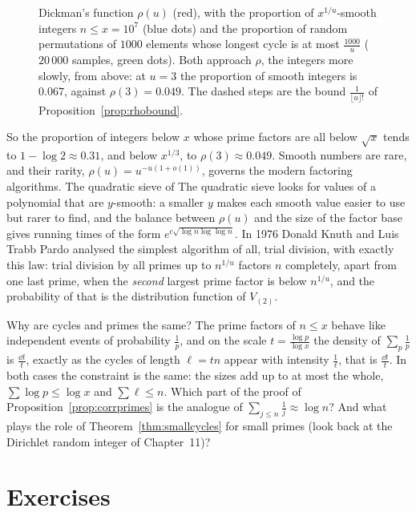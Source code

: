 \begin{figure}[ht]
\centering{}
\caption{Dickman's function $\rho(u)$ (red), with the proportion of $x^{1/u}$-smooth integers $n\le x=10^7$ (blue dots) and the proportion of random permutations of $1000$ elements whose longest cycle is at most $\frac{1000}u$ ($20\,000$ samples, green dots). Both
approach $\rho$, the integers more slowly, from above: at $u=3$ the proportion of smooth integers is $0.067$, against $\rho(3)=0.049$. The dashed steps are the bound $\frac1{\lfloor u\rfloor!}$ of Proposition~\ref{prop:rhobound}.}
\label{fig:rho}
\end{figure}

So the proportion of integers below $x$ whose prime factors are all below $\sqrt x$ tends to $1-\log2\approx0.31$, and below $x^{1/3}$, to $\rho(3)\approx0.049$. Smooth numbers are rare, and their rarity, $\rho(u)=u^{-u(1+o(1))}$, governs the modern factoring algorithms. The quadratic sieve of
The quadratic sieve looks for values of a polynomial that are $y$-smooth: a smaller $y$ makes each smooth value easier to use but rarer to find, and the balance between $\rho(u)$ and the size of the factor base gives running times of the form $e^{c\sqrt{\log n\log\log n}}$. In 1976 Donald Knuth and Luis Trabb Pardo
analysed the simplest algorithm of all, trial division, with exactly this law: trial division by all primes up to $n^{1/u}$ factors $n$ completely, apart from one last prime, when the \emph{second} largest prime factor is below $n^{1/u}$, and the probability of that is the
distribution function of $V_{(2)}$.

\begin{think}
Why are cycles and primes the same? The prime factors of $n\le x$ behave like independent events of probability $\frac1p$, and on the scale $t=\frac{\log p}{\log x}$ the density of $\sum_p\frac1p$ is $\frac{\dd t}t$, exactly as the cycles of length $\ell=tn$ appear with intensity $\frac1\ell$, that
is $\frac{\dd t}t$. In both cases the constraint is the same: the sizes add up to at most the whole, $\sum\log p\le\log x$ and $\sum\ell\le n$. Which part of the proof of Proposition~\ref{prop:corrprimes} is the analogue of $\sum_{j\le n}\frac1j\approx\log n$? And what plays the role of
Theorem~\ref{thm:smallcycles} for small primes (look back at the Dirichlet random integer of Chapter~11)?
\end{think}

\section{Exercises}

